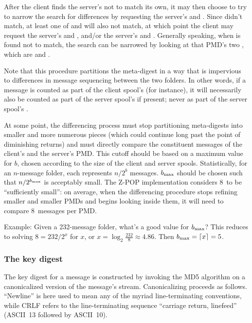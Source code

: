After the client finds the server's  not to match its own,
it may then choose to try to narrow the search for differences by
requesting the server's  and .  Since
 didn't match, at least one of  and 
will also not match, at which point the client may request the
server's  and , and/or the server's 
and .  Generally speaking, when  is found not to
match, the search can be narrowed by looking at that PMD's two
, which are  and .

Note that this procedure partitions the meta-digest in a way that is
impervious to differences in message sequencing between the two
folders.  In other words, if a message is counted as part of the
client spool's  (for instance), it will necessarily also be
counted as part of the server spool's  if present; never as
part of the server spool's .

At some point, the differencing process must stop partitioning
meta-digests into smaller and more numerous pieces (which could
continue long past the point of diminishing returns) and must directly
compare the constituent messages of the client's and the server's PMD.
This cutoff should be based on a maximum value for $b$, chosen
according to the size of the client and server spools.  Statistically,
for an $n$-message folder, each  represents $n/{2^b}$
messages.  ${b_{\rm max}}{}$ should be chosen such that $n/{2^{b_{\rm max}}{}}$ is
acceptably small.  The Z-POP implementation considers 8~to be
``sufficiently small'': on average, when the differencing procedure
stops refining smaller and smaller PMDs and begins looking inside
them, it will need to compare 8~messages per PMD.

Example: Given a 232-message folder, what's a good value for
${b_{\rm max}}{}$?  This reduces to solving $8 = 232/2^x$ for $x$, or
$x = \log_2\frac{232}{8} \approx 4.86$.  Then ${b_{\rm max}}{} = \lceil x \rceil =
5$.

\subsubsection{The key digest}

The key digest for a message is constructed by invoking the MD5
algorithm on a canonicalized version of the message's stream.
Canonicalizing proceeds as follows.  ``Newline'' is here used to mean
any of the myriad line-terminating conventions, while CRLF refers to
the line-terminating sequence ``carriage return, linefeed'' (ASCII~13
followed by ASCII~10).

